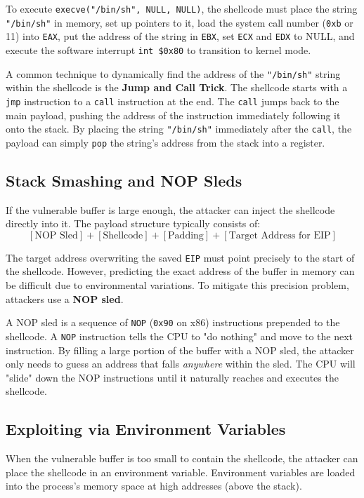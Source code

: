 To execute \texttt{execve("/bin/sh", NULL, NULL)}, the shellcode must place the string \texttt{"/bin/sh"} in memory, set up pointers to it, load the system call number (\texttt{0xb} or 11) into \texttt{EAX}, put the address of the string in \texttt{EBX}, set \texttt{ECX} and \texttt{EDX} to NULL, and execute the software interrupt \texttt{int \$0x80} to transition to kernel mode.

A common technique to dynamically find the address of the \texttt{"/bin/sh"} string within the shellcode is the \textbf{Jump and Call Trick}. The shellcode starts with a \texttt{jmp} instruction to a \texttt{call} instruction at the end. The \texttt{call} jumps back to the main payload, pushing the address of the instruction immediately following it onto the stack. By placing the string \texttt{"/bin/sh"} immediately after the \texttt{call}, the payload can simply \texttt{pop} the string's address from the stack into a register.

\subsection{Stack Smashing and NOP Sleds}
If the vulnerable buffer is large enough, the attacker can inject the shellcode directly into it. The payload structure typically consists of:
\[ [\text{NOP Sled}] + [\text{Shellcode}] + [\text{Padding}] + [\text{Target Address for EIP}] \]

The target address overwriting the saved \texttt{EIP} must point precisely to the start of the shellcode. However, predicting the exact address of the buffer in memory can be difficult due to environmental variations. To mitigate this precision problem, attackers use a \textbf{NOP sled}.

A NOP sled is a sequence of \texttt{NOP} (\texttt{0x90} on x86) instructions prepended to the shellcode. A \texttt{NOP} instruction tells the CPU to "do nothing" and move to the next instruction. By filling a large portion of the buffer with a NOP sled, the attacker only needs to guess an address that falls \textit{anywhere} within the sled. The CPU will "slide" down the NOP instructions until it naturally reaches and executes the shellcode.

\subsection{Exploiting via Environment Variables}
When the vulnerable buffer is too small to contain the shellcode, the attacker can place the shellcode in an environment variable. Environment variables are loaded into the process's memory space at high addresses (above the stack).

